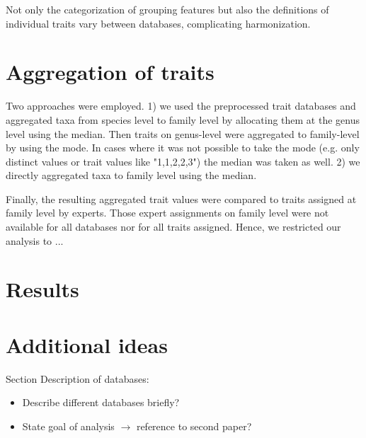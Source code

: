 \documentclass{article}
\begin{document}
Not only the categorization of grouping features but also the definitions of 
individual traits vary between databases, complicating harmonization. 

\section{Aggregation of traits}

Two approaches were employed. 1) we used the preprocessed trait databases and 
aggregated taxa from species level to family level by allocating them at the genus 
level using the median. Then traits on genus-level were aggregated to
family-level by using the mode. In cases where it was not possible to take the mode 
(e.g. only distinct values or trait values like "1,1,2,2,3") the median was taken as well. 
2) we directly aggregated taxa to family level using the median.

Finally, the resulting aggregated trait values were compared to traits assigned at 
family level by experts. Those expert assignments on family level were not available for 
all databases nor for all traits assigned. Hence, we restricted our analysis to ...

\section{Results}



\section*{Additional ideas}

Section Description of databases:
\begin{itemize}
    \item Describe different databases briefly?
    \item State goal of analysis $\rightarrow$ reference to second paper?
\end{itemize}
\end{document}
